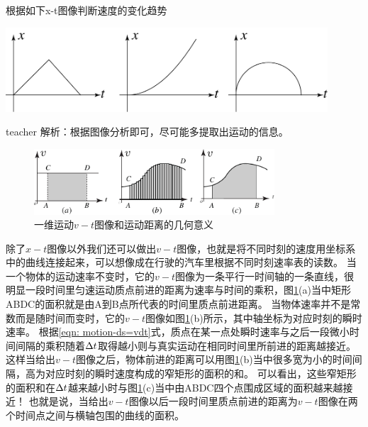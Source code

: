 \begin{example}
根据如下x-t图像判断速度的变化趋势
\begin{center}
\includegraphics[width = 0.9\textwidth]{images/motion-problem-5.pdf}
\end{center}
\begin{taggedblock}{teacher}
\noindent
解析：根据图像分析即可，尽可能多提取出运动的信息。
\end{taggedblock}
\end{example}





\begin{figure}[h]
\begin{center}
\includegraphics[width=0.8\textwidth]{images/motion-v-t.pdf}
\caption{一维运动$v-t$图像和运动距离的几何意义}
\label{fig: motion一维运动$v-t$图像以及运动距离的几何意义}
\end{center}
\end{figure}

除了$x-t$图像以外我们还可以做出$v-t$图像，也就是将不同时刻的速度用坐标系中的曲线连接起来，可以想像成在行驶的汽车里根据不同时刻速率表的读数。
当一个物体的运动速率不变时，它的$v-t$图像为一条平行一时间轴的一条直线，很明显一段时间里匀速运动质点前进的距离为速率与时间的乘积，图\ref{fig: motion一维运动$v-t$图像以及运动距离的几何意义}(a)当中矩形ABDC的面积就是由A到B点所代表的时间里质点前进距离。
当物体速率并不是常数而是随时间而变时，它的$v-t$图像如图\ref{fig: motion一维运动$v-t$图像以及运动距离的几何意义}(b)所示，其中轴坐标为对应时刻的瞬时速率。
根据\ref{eqn: motion-ds=vdt}式，质点在某一点处瞬时速率与之后一段微小时间间隔的乘积随着$\Delta t$取得越小则与真实运动在相同时间里所前进的距离越接近。
这样当给出$v-t$图像之后，物体前进的距离可以用图\ref{fig: motion一维运动$v-t$图像以及运动距离的几何意义}(b)当中很多宽为小的时间间隔，高为对应时刻的瞬时速度构成的窄矩形的面积的和。
可以看出，这些窄矩形的面积和在$\Delta t$越来越小时与图\ref{fig: motion一维运动$v-t$图像以及运动距离的几何意义}(c)当中由ABDC四个点围成区域的面积越来越接近！
也就是说，当给出$v-t$图像以后一段时间里质点前进的距离为$v-t$图像在两个时间点之间与横轴包围的曲线的面积。



